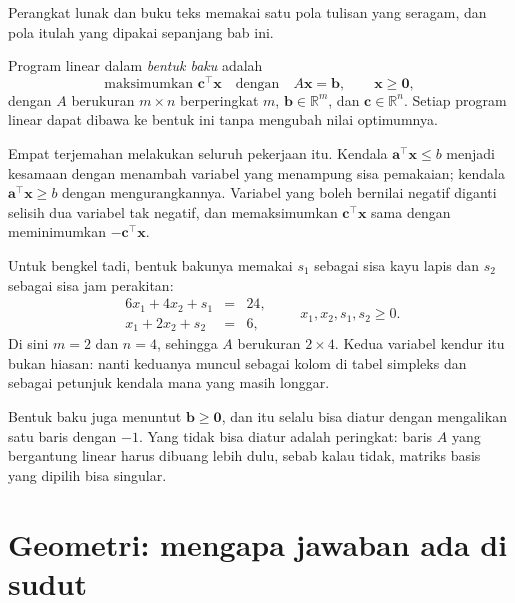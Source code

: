 Perangkat lunak dan buku teks memakai satu pola tulisan yang seragam, dan pola itulah yang
dipakai sepanjang bab ini.

\begin{definisi}
Program linear dalam \emph{bentuk baku} adalah
\[
  \text{maksimumkan } \mathbf{c}^{\top}\mathbf{x}
  \quad\text{dengan}\quad A\mathbf{x}=\mathbf{b},\qquad \mathbf{x}\ge\mathbf{0},
\]
dengan $A$ berukuran $m\times n$ berperingkat $m$, $\mathbf{b}\in\mathbb{R}^{m}$, dan
$\mathbf{c}\in\mathbb{R}^{n}$. Setiap program linear dapat dibawa ke bentuk ini tanpa
mengubah nilai optimumnya.
\end{definisi}

Empat terjemahan melakukan seluruh pekerjaan itu. Kendala
$\mathbf{a}^{\top}\mathbf{x}\le b$ menjadi kesamaan dengan menambah variabel yang menampung
sisa pemakaian; kendala $\mathbf{a}^{\top}\mathbf{x}\ge b$ dengan mengurangkannya. Variabel
yang boleh bernilai negatif diganti selisih dua variabel tak negatif, dan memaksimumkan
$\mathbf{c}^{\top}\mathbf{x}$ sama dengan meminimumkan $-\mathbf{c}^{\top}\mathbf{x}$.


Untuk bengkel tadi, bentuk bakunya memakai $s_{1}$ sebagai sisa kayu lapis dan $s_{2}$
sebagai sisa jam perakitan:
\[
  \begin{array}{rcl}
    6x_{1}+4x_{2}+s_{1} &=& 24,\\
    x_{1}+2x_{2}+s_{2} &=& 6,
  \end{array}
  \qquad x_{1},x_{2},s_{1},s_{2}\ge0 .
\]
Di sini $m=2$ dan $n=4$, sehingga $A$ berukuran $2\times4$. Kedua variabel kendur itu bukan
hiasan: nanti keduanya muncul sebagai kolom di tabel simpleks dan sebagai petunjuk kendala
mana yang masih longgar.

Bentuk baku juga menuntut $\mathbf{b}\ge\mathbf{0}$, dan itu selalu bisa diatur
dengan mengalikan satu baris dengan $-1$. Yang tidak bisa diatur adalah peringkat: baris $A$
yang bergantung linear harus dibuang lebih dulu, sebab kalau tidak, matriks basis yang dipilih
bisa singular.

\section{Geometri: mengapa jawaban ada di sudut}

